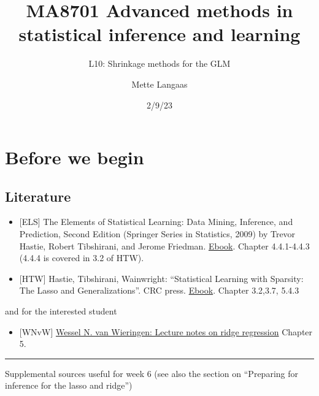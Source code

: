 \documentclass[
  letterpaper,
  DIV=11,
  numbers=noendperiod]{scrartcl}
\title{MA8701 Advanced methods in statistical inference and learning}
\subtitle{L10: Shrinkage methods for the GLM}
\author{Mette Langaas}
\date{2/9/23}
\providecommand{\tightlist}{%
  \setlength{\itemsep}{0pt}\setlength{\parskip}{0pt}}\usepackage{longtable,booktabs,array}
\renewcommand*\contentsname{Table of contents}
\newcommand\contentsname{Table of contents}
\begin{document}
\maketitle
\ifdefined\Shaded\renewenvironment{Shaded}{\begin{tcolorbox}[interior hidden, boxrule=0pt, borderline west={3pt}{0pt}{shadecolor}, breakable, sharp corners, enhanced, frame hidden]}{\end{tcolorbox}}\fi

\renewcommand*\contentsname{Table of contents}
{
\hypersetup{linkcolor=}
\setcounter{tocdepth}{3}
\tableofcontents
}
\hypertarget{before-we-begin}{%
\section{Before we begin}\label{before-we-begin}}

\hypertarget{literature}{%
\subsection{Literature}\label{literature}}

\begin{itemize}
\item
  {[}ELS{]} The Elements of Statistical Learning: Data Mining,
  Inference, and Prediction, Second Edition (Springer Series in
  Statistics, 2009) by Trevor Hastie, Robert Tibshirani, and Jerome
  Friedman.
  \href{https://web.stanford.edu/~hastie/Papers/ESLII.pdf}{Ebook}.
  Chapter 4.4.1-4.4.3 (4.4.4 is covered in 3.2 of HTW).
\item
  {[}HTW{]} Hastie, Tibshirani, Wainwright: ``Statistical Learning with
  Sparsity: The Lasso and Generalizations''. CRC press.
  \href{https://hastie.su.domains/StatLearnSparsity/}{Ebook}. Chapter
  3.2,3.7, 5.4.3
\end{itemize}

and for the interested student

\begin{itemize}
\tightlist
\item
  {[}WNvW{]} \href{https://arxiv.org/pdf/1509.09169v7.pdf}{Wessel N. van
  Wieringen: Lecture notes on ridge regression} Chapter 5.
\end{itemize}

\begin{center}\rule{0.5\linewidth}{0.5pt}\end{center}

Supplemental sources useful for week 6 (see also the section on
``Preparing for inference for the lasso and ridge'')
\end{document}
